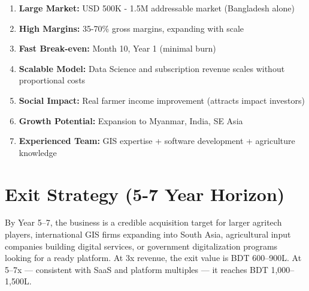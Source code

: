 \begin{enumerate}
    \item \textbf{Large Market:} USD 500K - 1.5M addressable market (Bangladesh alone)
    \item \textbf{High Margins:} 35-70\% gross margins, expanding with scale
    \item \textbf{Fast Break-even:} Month 10, Year 1 (minimal burn)
    \item \textbf{Scalable Model:} Data Science and subscription revenue scales without proportional costs
    \item \textbf{Social Impact:} Real farmer income improvement (attracts impact investors)
    \item \textbf{Growth Potential:} Expansion to Myanmar, India, SE Asia
    \item \textbf{Experienced Team:} GIS expertise + software development + agriculture knowledge
\end{enumerate}

\section{Exit Strategy (5-7 Year Horizon)}

By Year 5--7, the business is a credible acquisition target for larger agritech players, international GIS firms expanding into South Asia, agricultural input companies building digital services, or government digitalization programs looking for a ready platform. At 3x revenue, the exit value is BDT 600--900L. At 5--7x --- consistent with SaaS and platform multiples --- it reaches BDT 1,000--1,500L.

